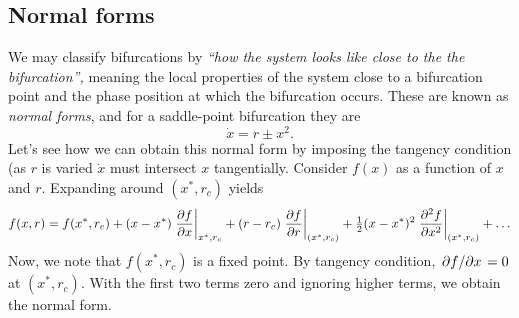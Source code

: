 \documentclass[oneside]{book}
\begin{document}
\subsection{Normal forms}
We may classify bifurcations by \textit{``how the system looks like close to the the bifurcation'',} meaning the local properties of the system close to a bifurcation point and the phase position at which the bifurcation occurs. These are known as \textit{normal forms}, and for a saddle-point bifurcation they are
\begin{equation}
\dot{x} = r \pm x^2.
\end{equation}
Let's see how we can obtain this normal form by imposing the tangency condition (as $ r $ is varied $ \dot{x} $ must intersect $ x $ tangentially. Consider $ f(x) $ as a function of $ x $ and $ r $. Expanding around $ (x^*, r_c) $ yields
\[
f(x,r) = f(x^*, r_c) + (x - x^*) \eval{\pdv{f}{x}}_{x^*, r_c} + (r - r_c) \eval{\pdv{f}{r}}_{(x^*, r_c)} + \tfrac{1}{2} (x - x^*)^2 \eval{\pdv[2]{f}{x}}_{(x^*, r_c)} + \ldots
\]
Now, we note that $ f(x^*, r_c) $ is a fixed point. By tangency condition, $ \pdv*{f}{x} = 0 $ at $ (x^*, r_c) $. With the first two terms zero and ignoring higher terms, we obtain the normal form.
\end{document}
